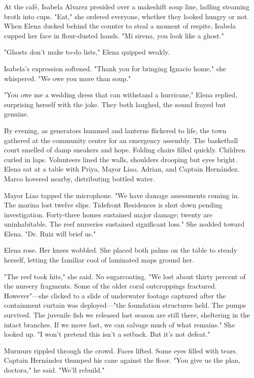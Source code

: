 At the café, Isabela Alvarez presided over a makeshift soup line, ladling steaming broth into cups. "Eat," she ordered everyone, whether they looked hungry or not. When Elena ducked behind the counter to steal a moment of respite, Isabela cupped her face in flour-dusted hands. "Mi sirena, you look like a ghost."

"Ghosts don't make to-do lists," Elena quipped weakly.

Isabela's expression softened. "Thank you for bringing Ignacio home," she whispered. "We owe you more than soup."

"You owe me a wedding dress that can withstand a hurricane," Elena replied, surprising herself with the joke. They both laughed, the sound frayed but genuine.

By evening, as generators hummed and lanterns flickered to life, the town gathered at the community center for an emergency assembly. The basketball court smelled of damp sneakers and hope. Folding chairs filled quickly. Children curled in laps. Volunteers lined the walls, shoulders drooping but eyes bright. Elena sat at a table with Priya, Mayor Liao, Adrian, and Captain Hernández. Marco hovered nearby, distributing bottled water.

Mayor Liao tapped the microphone. "We have damage assessments coming in. The marina lost twelve slips. Tidefront Residences is shut down pending investigation. Forty-three homes sustained major damage; twenty are uninhabitable. The reef nurseries sustained significant loss." She nodded toward Elena. "Dr. Ruiz will brief us."

Elena rose. Her knees wobbled. She placed both palms on the table to steady herself, letting the familiar cool of laminated maps ground her.

"The reef took hits," she said. No sugarcoating. "We lost about thirty percent of the nursery fragments. Some of the older coral outcroppings fractured. However"—she clicked to a slide of underwater footage captured after the containment curtain was deployed—"the foundation structures held. The pumps survived. The juvenile fish we released last season are still there, sheltering in the intact branches. If we move fast, we can salvage much of what remains." She looked up. "I won't pretend this isn't a setback. But it's not defeat."

Murmurs rippled through the crowd. Faces lifted. Some eyes filled with tears. Captain Hernández thumped his cane against the floor. "You give us the plan, doctora," he said. "We'll rebuild."

